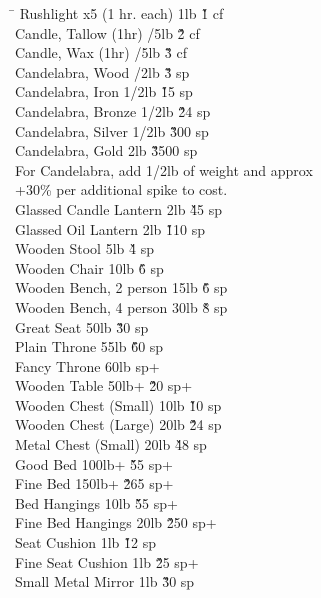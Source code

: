 \begin{multicols}{3}
{\begin{tabbing}
\hspace{0.8\linewidth}\= \kill
Rushlight x5 (1 hr. each)		\> 1lb			\' \` 1 cf \\
Candle, Tallow (1hr)			/5lb		\' \` 2 cf \\
Candle, Wax (1hr)			/5lb		\' \` 3 cf \\
Candelabra, Wood			/2lb		\' \` 3 sp \\
Candelabra, Iron			 1/2lb		\' \` 15 sp \\
Candelabra, Bronze			 1/2lb		\' \` 24 sp \\
Candelabra, Silver			 1/2lb		\' \` 300 sp \\
Candelabra, Gold			\> 2lb			\' \` 3500 sp \\
For Candelabra, add 1/2lb of weight and approx \\
+30\% per additional spike to cost. \\
Glassed Candle Lantern			\> 2lb			\' \` 45 sp \\
Glassed Oil Lantern			\> 2lb			\' \` 110 sp \\
Wooden Stool			\> 5lb			\' \` 4 sp \\
Wooden Chair			\> 10lb			\' \` 6 sp \\
Wooden Bench, 2 person			\> 15lb			\' \` 6 sp \\
Wooden Bench, 4 person			\> 30lb			\' \` 8 sp \\
Great Seat			\> 50lb			\' \` 30 sp \\
Plain Throne			\> 55lb			\' \` 60 sp \\
Fancy Throne			\hfill 60lb			 sp+			\' \` \\
Wooden Table			\> 50lb+			\' \` 20 sp+ \\
Wooden Chest (Small)			\> 10lb			\' \` 10 sp \\
Wooden Chest (Large)			\> 20lb			\' \` 24 sp \\
Metal Chest (Small)			\> 20lb			\' \` 48 sp \\
Good Bed			\> 100lb+			\' \` 55 sp+ \\
Fine Bed			\> 150lb+			\' \` 265 sp+ \\
Bed Hangings			\> 10lb			\' \` 55 sp+ \\
Fine Bed Hangings			\> 20lb			\' \` 250 sp+ \\
Seat Cushion			\> 1lb			\' \` 12 sp \\
Fine Seat Cushion			\> 1lb			\' \` 25 sp+ \\
Small Metal Mirror			\> 1lb			\' \` 30 sp \\

\end{tabbing}}
\end{multicols}
